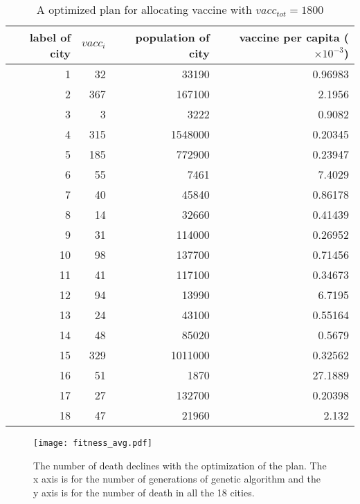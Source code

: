 \begin{table}[]
\centering
\begin{tabular}{|r|r|r|r|}
\hline
label of city&$vacc_i$&population of city & vaccine per capita ($\times 10^{-3}$)\\ \hline
1&32&33190&0.96983\\ \hline
2&367&167100&2.1956\\ \hline
3&3&3222&0.9082\\ \hline
4&315&1548000&0.20345\\ \hline
5&185&772900&0.23947\\ \hline
6&55&7461&7.4029\\ \hline
7&40&45840&0.86178\\ \hline
8&14&32660&0.41439\\ \hline
9&31&114000&0.26952\\ \hline
10&98&137700&0.71456\\ \hline
11&41&117100&0.34673\\ \hline
12&94&13990&6.7195\\ \hline
13&24&43100&0.55164\\ \hline
14&48&85020&0.5679\\ \hline
15&329&1011000&0.32562\\ \hline
16&51&1870&27.1889\\ \hline
17&27&132700&0.20398\\ \hline
18&47&21960&2.132\\ \hline
\end{tabular}
\caption{A optimized plan for allocating vaccine with $vacc_{tot} = 1800$ }
\label{result}
\end{table}

\begin{figure}
\centering
\texttt{[image: fitness\_avg.pdf]}
\caption{The number of death declines with the optimization of the plan. The x axis is for the number of generations of genetic algorithm and the y axis is for the number of death in all the 18 cities.}
\label{fitness_avg}
\end{figure}

